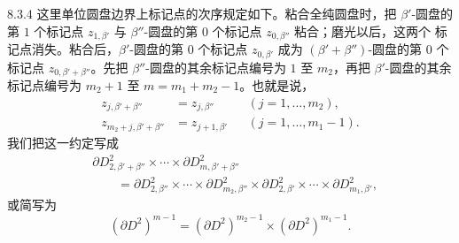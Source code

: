 \begin{remark}{8.3.4}\label{rem:8-3-4}
这里单位圆盘边界上标记点的次序规定如下。粘合全纯圆盘时，把
$\beta'$-圆盘的第 $1$ 个标记点 $z_{1,\beta'}$ 与
$\beta''$-圆盘的第 $0$ 个标记点 $z_{0,\beta''}$ 粘合；磨光以后，这两个
标记点消失。粘合后，$\beta'$-圆盘的第 $0$ 个标记点
$z_{0,\beta'}$ 成为 $(\beta'+\beta'')$-圆盘的第 $0$ 个标记点
$z_{0,\beta'+\beta''}$。先把 $\beta''$-圆盘的其余标记点编号为
$1$ 至 $m_2$，再把 $\beta'$-圆盘的其余标记点编号为
$m_2+1$ 至 $m=m_1+m_2-1$。也就是说，
\[
\begin{aligned}
 z_{j,\beta'+\beta''}&=z_{j,\beta''}
 &&(j=1,\ldots,m_2),\\
 z_{m_2+j,\beta'+\beta''}&=z_{j+1,\beta'}
 &&(j=1,\ldots,m_1-1).
\end{aligned}
\]
我们把这一约定写成
\[
\begin{aligned}
 &\partial D^2_{2,\beta'+\beta''}\times\cdots\times
  \partial D^2_{m,\beta'+\beta''}\\
 &\qquad={}
 \partial D^2_{2,\beta''}\times\cdots\times
 \partial D^2_{m_2,\beta''}\times
 \partial D^2_{2,\beta'}\times\cdots\times
 \partial D^2_{m_1,\beta'},
\end{aligned}
\]
或简写为
\[
 (\partial D^2)^{m-1}
 =(\partial D^2)^{m_2-1}\times(\partial D^2)^{m_1-1}.
\]
\end{remark}



